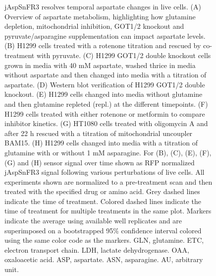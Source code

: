 \documentclass[9pt,lineno]{elife}
\begin{document}
\begin{figure}[ht!]
\ContinuedFloat
\caption{
jAspSnFR3 resolves temporal aspartate changes in live cells.
(A) Overview of aspartate metabolism, highlighting how glutamine depletion, mitochondrial inhibition, GOT1/2 knockout and pyruvate/asparagine supplementation can impact aspartate levels.
(B) H1299 cells treated with a rotenone titration and rescued by co-treatment with pyruvate.
(C) H1299 GOT1/2 double knockout cells grown in media with 40 mM aspartate, washed thrice in media without aspartate and then changed into media with a titration of aspartate.
(D) Western blot verification of H1299 GOT1/2 double knockout.
(E) H1299 cells changed into media without glutamine and then glutamine repleted (repl.) at the different timepoints.
(F) H1299 cells treated with either rotenone or metformin to compare inhibitor kinetics.
(G) HT1080 cells treated with oligomycin A and after 22 h rescued with a titration of mitochondrial uncoupler BAM15.
(H) H1299 cells changed into media with a titration of glutamine with or without 1 mM asparagine.
For (B), (C), (E), (F), (G) and (H) sensor signal over time shown as RFP normalized jAspSnFR3 signal following various perturbations of live cells.
All experiments shown are normalized to a pre-treatment scan and then treated with the specified drug or amino acid.
Grey dashed lines indicate the time of treatment.
Colored dashed lines indicate the time of treatment for multiple treatments in the same plot.
Markers indicate the average using available well replicates and are superimposed on a bootstrapped 95\% confidence interval colored using the same color code as the markers.
GLN, glutamine.
ETC, electron transport chain.
LDH, lactate dehydrogenase.
OAA, oxaloacetic acid.
ASP, aspartate.
ASN, asparagine.
AU, arbitrary unit.
}
\label{fig:Fig2}
\end{figure}
\end{document}
